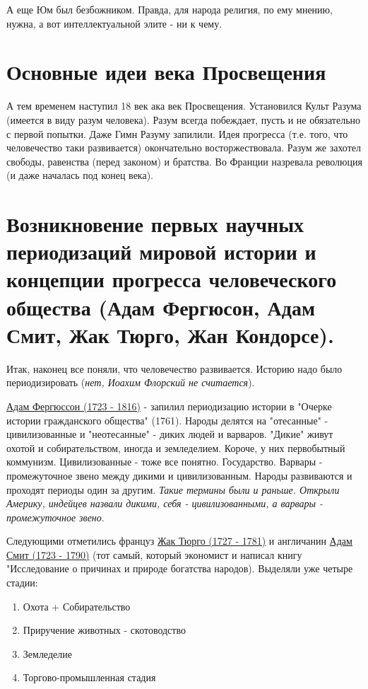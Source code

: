 А еще Юм был безбожником. Правда, для народа религия, по ему мнению, нужна, а вот интеллектуальной элите - ни к чему.  

\section{Основные идеи века Просвещения}
А тем временем наступил 18 век ака век Просвещения. Установился Культ Разума (имеется в виду разум человека). Разум всегда побеждает, пусть и не обязательно с первой попытки. Даже Гимн Разуму запилили. Идея прогресса (т.е. того, что человечество таки развивается) окончательно восторжествовала.
Разум же захотел свободы, равенства (перед законом) и братства. Во Франции назревала революция (и даже началась под конец века). 

\section{Возникновение первых научных периодизаций мировой истории и концепции прогресса человеческого общества (Адам Фергюсон, Адам Смит, Жак Тюрго, Жан Кондорсе).}
Итак, наконец все поняли, что человечество развивается. Историю надо было периодизировать (\textit{нет, Иоахим Флорский не считается}).

\underline{Адам Фергюссон (1723 - 1816)} - запилил периодизацию истории в "Очерке истории гражданского общества" (1761). Народы делятся на "отесанные" - цивилизованные и "неотесанные" - диких людей и варваров. "Дикие" живут охотой и собирательством, иногда и земледелием. Короче, у них первобытный коммунизм. Цивилизованные - тоже все понятно. Государство. Варвары -  промежуточное звено между дикими и цивилизованным. Народы развиваются и проходят периоды один за другим.
\textit{Такие термины были и раньше. Открыли Америку, индейцев назвали дикими, себя - цивилизованными, а варвары - промежуточное звено}.

Следующими отметились француз \underline{Жак Тюрго (1727 - 1781)} и англичанин \underline{Адам Смит (1723 - 1790)} (тот самый, который экономист и написал книгу "Исследование о причинах и природе богатства народов). Выделяли уже четыре стадии:
\begin{enumerate}
\item Охота + Собирательство 
\item Приручение животных - скотоводство
\item Земледелие
\item Торгово-промышленная стадия
\end{enumerate}

